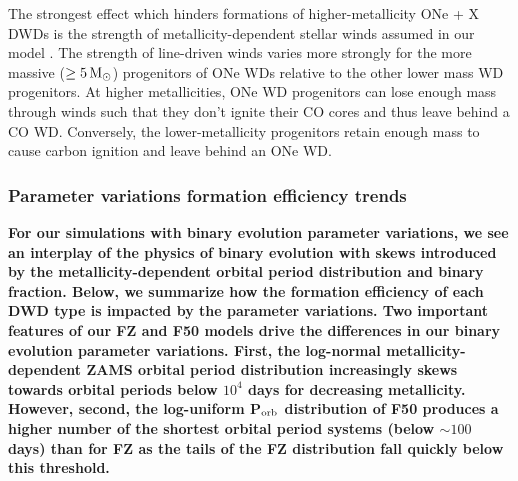 \documentclass[twocolumn, linenumbers]{aastex631}
\begin{document}
The strongest effect which hinders formations of higher-metallicity ONe + X DWDs is the strength of metallicity-dependent stellar winds assumed in our model \citep{Vink2001}. The strength of line-driven winds varies more strongly for the more massive ($\geq5\,\rm{M}_\odot$) progenitors of ONe WDs relative to the other lower mass WD progenitors. At higher metallicities, ONe WD progenitors can lose enough mass through winds such that they don't ignite their CO cores and thus leave behind a CO WD. Conversely, the lower-metallicity progenitors retain enough mass to cause carbon ignition and leave behind an ONe WD. 


\subsubsection{\textbf{Parameter variations formation efficiency trends}}\label{subsec:formeff_vars}

\textbf{For our simulations with binary evolution parameter variations, we see an interplay of the physics of binary evolution with skews introduced by the metallicity-dependent orbital period distribution and binary fraction. Below, we summarize how the formation efficiency of each DWD type is impacted by the parameter variations. Two important features of our FZ and F50 models drive the differences in our binary evolution parameter variations. First, the log-normal metallicity-dependent ZAMS orbital period distribution increasingly skews towards orbital periods below $10^4$ days for decreasing metallicity. However, second, the log-uniform P$_{\rm{orb}}$ distribution of F50 produces a higher number of the shortest orbital period systems (below $\sim 100$ days) than for FZ as the tails of the FZ distribution fall quickly below this threshold.} 
\end{document}
